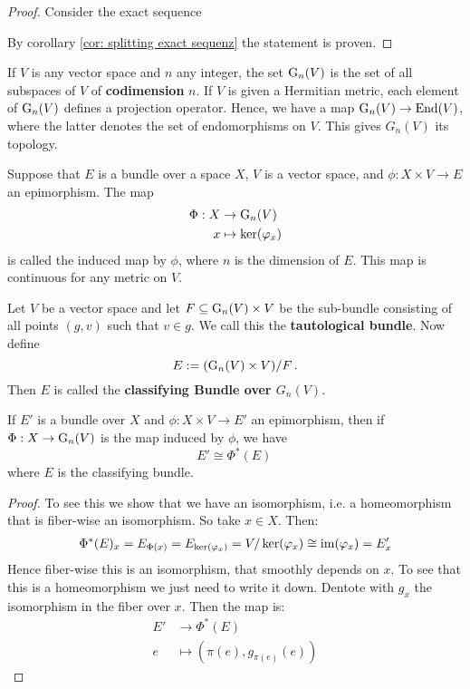 \begin{proof}
	Consider the exact sequence 
	 By corollary \ref{cor: splitting exact sequenz} the statement is proven.
\end{proof}
\begin{definition}\label{def: Grassmann Manifold}
	If $V$ is any vector space and $n$ any integer, the set $\mathrm{G}_n(V)$ is the set of all subspaces of $V$ of \textbf{codimension} $n$. If $V$ is given a Hermitian metric, each element of $\mathrm{G}_n(V)$ defines a projection operator. Hence, we have a map $\mathrm{G}_n(V)\to \operatorname{\mathrm{End}}(V)$, where the latter denotes the set of endomorphisms on $V$. This gives $G_n(V)$ its topology. 
	
	Suppose that $E$ is a bundle over a space $X$, $V$ is a vector space, and $\phi: X\times V \to E$ an epimorphism. The map
	\begin{align*}
		\Phi: X & \to \mathrm{G}_n(V)\\
		x &\mapsto \ker(\varphi_x)
	\end{align*} is called the induced map by $\phi$, where $n$ is the dimension of $E$. This map is continuous for any metric on $V$.
\end{definition}
\begin{definition}\label{def: Classifying Bundle over Grassmanian}
	Let $V$ be a vector space and let $F\subseteq \mathrm{G}_n(V)\times V$ be the sub-bundle consisting of all points $(g,v)$ such that $v\in g$. We call this the \textbf{tautological bundle}. Now define
	\begin{equation*}
		E:= (\mathrm{G}_n(V)\times V)\slash F\,.
	\end{equation*} Then $E$ is called the \textbf{classifying Bundle over $G_n(V)$}.
\end{definition}
\begin{cor}
	If $E'$ is a bundle over $X$ and $\phi: X\times V\to E'$ an epimorphism, then if $\Phi:X\to \mathrm{G}_n(V)$ is the map induced by $\phi$, we have
	\begin{equation*}
		E'\cong \Phi^*(E)\,
	\end{equation*} where $E$ is the classifying bundle.
\end{cor}
\begin{proof}
	To see this we show that we have an isomorphism, i.e. a homeomorphism that is fiber-wise an isomorphism.
	So take $x\in X$. Then:
	\begin{align*}
		\Phi^*(E)_x=E_{\Phi(x)}=E_{\ker(\varphi_x)}=V \slash \ker(\varphi_x)\cong \mathrm{im}(\varphi_x)=E'_x
	\end{align*} Hence fiber-wise this is an isomorphism, that smoothly depends on $x$. To see that this is a homeomorphism we just need to write it down. Dentote with $g_x$ the isomorphism in the fiber over $x$. Then the map is:
	\begin{align*}
		E'  & \to \Phi^*(E) \\
		e   &\mapsto (\pi(e),g_{\pi(e)}(e))
	\end{align*}
\end{proof}
